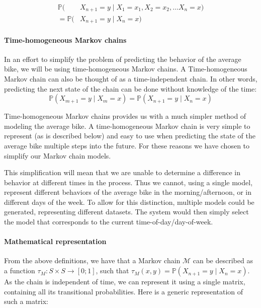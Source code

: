 \begin{align}\label{markov:eq:markov_prob}
\mathbb{P}(&X_{n+1} = y \mid X_1 = x_1, X_2 = x_2, \dots X_n = x)\nonumber\\
= \mathbb{P}(&X_{n+1} = y \mid X_n = x)
\end{align}

\paragraph{Time-homogeneous Markov chains}
In an effort to simplify the problem of predicting the behavior of the average bike, we will be using time-homogeneous Markov chains.
A Time-homogeneous Markov chain can also be thought of as a time-independent chain.
In other words, predicting the next state of the chain can be done without knowledge of the time:
\begin{equation}
\mathbb{P}(X_{m+1} = y \mid X_m = x) = \mathbb{P}(X_{n+1} = y \mid X_n = x)
\end{equation}

Time-homogeneous Markov chains provides us with a much simpler method of modeling the average bike.
A time-homogeneous Markov chain is very simple to represent (as is described below) and easy to use when predicting the state of the average bike multiple steps into the future.
For these reasons we have chosen to simplify our Markov chain models.

This simplification will mean that we are unable to determine a difference in behavior at different times in the process.
Thus we cannot, using a single model, represent different behaviors of the average bike in the morning/afternoon, or in different days of the week.
To allow for this distinction, multiple models could be generated, representing different datasets.
The system would then simply select the model that corresponds to the current time-of-day/day-of-week.

\paragraph{Mathematical representation}\label{markov:math}
From the above definitions, we have that a Markov chain $\mathcal{M}$ can be described as a function $\tau_M:S\times S \rightarrow [0;1]$, such that $\tau_M(x, y) = \mathbb{P}(X_{n + 1} = y \mid X_n = x)$.
As the chain is independent of time, we can represent it using a single matrix, containing all its transitional probabilities.
Here is a generic representation of such a matrix:

